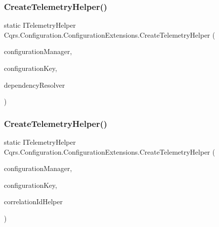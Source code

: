 \subsubsection{\texorpdfstring{Create\+Telemetry\+Helper()}{CreateTelemetryHelper()}\hspace{0.1cm}{\footnotesize\ttfamily [1/2]}}
{\footnotesize\ttfamily static I\+Telemetry\+Helper Cqrs.\+Configuration.\+Configuration\+Extensions.\+Create\+Telemetry\+Helper (\begin{DoxyParamCaption}\item[{this \hyperlink{interfaceCqrs_1_1Configuration_1_1IConfigurationManager}{I\+Configuration\+Manager}}]{configuration\+Manager,  }\item[{string}]{configuration\+Key,  }\item[{\hyperlink{interfaceCqrs_1_1Configuration_1_1IDependencyResolver}{I\+Dependency\+Resolver}}]{dependency\+Resolver }\end{DoxyParamCaption})\hspace{0.3cm}{\ttfamily [static]}}

\mbox{\label{classCqrs_1_1Configuration_1_1ConfigurationExtensions_a5b4906550efcc42fd0904c23bd7ae685_a5b4906550efcc42fd0904c23bd7ae685}} 
\subsubsection{\texorpdfstring{Create\+Telemetry\+Helper()}{CreateTelemetryHelper()}\hspace{0.1cm}{\footnotesize\ttfamily [2/2]}}
{\footnotesize\ttfamily static I\+Telemetry\+Helper Cqrs.\+Configuration.\+Configuration\+Extensions.\+Create\+Telemetry\+Helper (\begin{DoxyParamCaption}\item[{this \hyperlink{interfaceCqrs_1_1Configuration_1_1IConfigurationManager}{I\+Configuration\+Manager}}]{configuration\+Manager,  }\item[{string}]{configuration\+Key,  }\item[{I\+Correlation\+Id\+Helper}]{correlation\+Id\+Helper }\end{DoxyParamCaption})\hspace{0.3cm}{\ttfamily [static]}}

